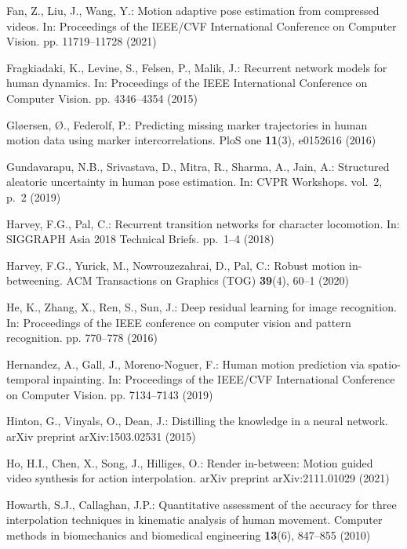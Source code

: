 \documentclass[runningheads]{llncs}
\begin{document}
\begin{thebibliography}{10}
Fan, Z., Liu, J., Wang, Y.: Motion adaptive pose estimation from compressed
  videos. In: Proceedings of the IEEE/CVF International Conference on Computer
  Vision. pp. 11719--11728 (2021)

Fragkiadaki, K., Levine, S., Felsen, P., Malik, J.: Recurrent network models
  for human dynamics. In: Proceedings of the IEEE International Conference on
  Computer Vision. pp. 4346--4354 (2015)

Gl{\o}ersen, {\O}., Federolf, P.: Predicting missing marker trajectories in
  human motion data using marker intercorrelations. PloS one  \textbf{11}(3),
  e0152616 (2016)

Gundavarapu, N.B., Srivastava, D., Mitra, R., Sharma, A., Jain, A.: Structured
  aleatoric uncertainty in human pose estimation. In: CVPR Workshops. vol.~2,
  p.~2 (2019)

Harvey, F.G., Pal, C.: Recurrent transition networks for character locomotion.
  In: SIGGRAPH Asia 2018 Technical Briefs. pp.~1--4 (2018)

Harvey, F.G., Yurick, M., Nowrouzezahrai, D., Pal, C.: Robust motion
  in-betweening. ACM Transactions on Graphics (TOG)  \textbf{39}(4),  60--1
  (2020)

He, K., Zhang, X., Ren, S., Sun, J.: Deep residual learning for image
  recognition. In: Proceedings of the IEEE conference on computer vision and
  pattern recognition. pp. 770--778 (2016)

Hernandez, A., Gall, J., Moreno-Noguer, F.: Human motion prediction via
  spatio-temporal inpainting. In: Proceedings of the IEEE/CVF International
  Conference on Computer Vision. pp. 7134--7143 (2019)

Hinton, G., Vinyals, O., Dean, J.: Distilling the knowledge in a neural
  network. arXiv preprint arXiv:1503.02531  (2015)

Ho, H.I., Chen, X., Song, J., Hilliges, O.: Render in-between: Motion guided
  video synthesis for action interpolation. arXiv preprint arXiv:2111.01029
  (2021)

Howarth, S.J., Callaghan, J.P.: Quantitative assessment of the accuracy for
  three interpolation techniques in kinematic analysis of human movement.
  Computer methods in biomechanics and biomedical engineering  \textbf{13}(6),
  847--855 (2010)


\end{thebibliography}
\end{document}
